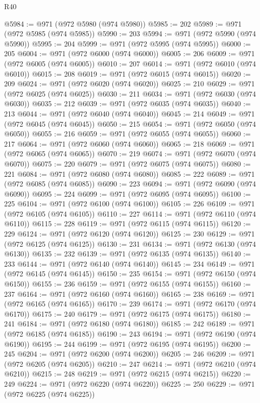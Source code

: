 \begin{lexlean}{R40}
\begin{coremodule}
@5984 := @971 (@972 @5980 (@974 @5980))
@5985 := 202
@5989 := @971 (@972 @5985 (@974 @5985))
@5990 := 203
@5994 := @971 (@972 @5990 (@974 @5990))
@5995 := 204
@5999 := @971 (@972 @5995 (@974 @5995))
@6000 := 205
@6004 := @971 (@972 @6000 (@974 @6000))
@6005 := 206
@6009 := @971 (@972 @6005 (@974 @6005))
@6010 := 207
@6014 := @971 (@972 @6010 (@974 @6010))
@6015 := 208
@6019 := @971 (@972 @6015 (@974 @6015))
@6020 := 209
@6024 := @971 (@972 @6020 (@974 @6020))
@6025 := 210
@6029 := @971 (@972 @6025 (@974 @6025))
@6030 := 211
@6034 := @971 (@972 @6030 (@974 @6030))
@6035 := 212
@6039 := @971 (@972 @6035 (@974 @6035))
@6040 := 213
@6044 := @971 (@972 @6040 (@974 @6040))
@6045 := 214
@6049 := @971 (@972 @6045 (@974 @6045))
@6050 := 215
@6054 := @971 (@972 @6050 (@974 @6050))
@6055 := 216
@6059 := @971 (@972 @6055 (@974 @6055))
@6060 := 217
@6064 := @971 (@972 @6060 (@974 @6060))
@6065 := 218
@6069 := @971 (@972 @6065 (@974 @6065))
@6070 := 219
@6074 := @971 (@972 @6070 (@974 @6070))
@6075 := 220
@6079 := @971 (@972 @6075 (@974 @6075))
@6080 := 221
@6084 := @971 (@972 @6080 (@974 @6080))
@6085 := 222
@6089 := @971 (@972 @6085 (@974 @6085))
@6090 := 223
@6094 := @971 (@972 @6090 (@974 @6090))
@6095 := 224
@6099 := @971 (@972 @6095 (@974 @6095))
@6100 := 225
@6104 := @971 (@972 @6100 (@974 @6100))
@6105 := 226
@6109 := @971 (@972 @6105 (@974 @6105))
@6110 := 227
@6114 := @971 (@972 @6110 (@974 @6110))
@6115 := 228
@6119 := @971 (@972 @6115 (@974 @6115))
@6120 := 229
@6124 := @971 (@972 @6120 (@974 @6120))
@6125 := 230
@6129 := @971 (@972 @6125 (@974 @6125))
@6130 := 231
@6134 := @971 (@972 @6130 (@974 @6130))
@6135 := 232
@6139 := @971 (@972 @6135 (@974 @6135))
@6140 := 233
@6144 := @971 (@972 @6140 (@974 @6140))
@6145 := 234
@6149 := @971 (@972 @6145 (@974 @6145))
@6150 := 235
@6154 := @971 (@972 @6150 (@974 @6150))
@6155 := 236
@6159 := @971 (@972 @6155 (@974 @6155))
@6160 := 237
@6164 := @971 (@972 @6160 (@974 @6160))
@6165 := 238
@6169 := @971 (@972 @6165 (@974 @6165))
@6170 := 239
@6174 := @971 (@972 @6170 (@974 @6170))
@6175 := 240
@6179 := @971 (@972 @6175 (@974 @6175))
@6180 := 241
@6184 := @971 (@972 @6180 (@974 @6180))
@6185 := 242
@6189 := @971 (@972 @6185 (@974 @6185))
@6190 := 243
@6194 := @971 (@972 @6190 (@974 @6190))
@6195 := 244
@6199 := @971 (@972 @6195 (@974 @6195))
@6200 := 245
@6204 := @971 (@972 @6200 (@974 @6200))
@6205 := 246
@6209 := @971 (@972 @6205 (@974 @6205))
@6210 := 247
@6214 := @971 (@972 @6210 (@974 @6210))
@6215 := 248
@6219 := @971 (@972 @6215 (@974 @6215))
@6220 := 249
@6224 := @971 (@972 @6220 (@974 @6220))
@6225 := 250
@6229 := @971 (@972 @6225 (@974 @6225))

\end{coremodule}
\end{lexlean}
